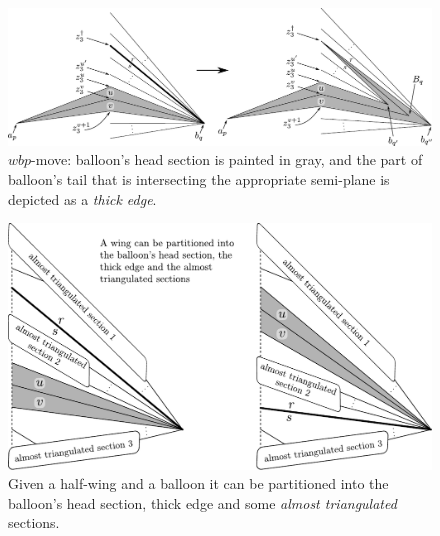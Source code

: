 \begin{figure}[!htb]
\begin{center}
\includegraphics[width=15.4cm]{A.figs/controlmaps01.pdf}
\caption{$wbp$-move: balloon's head section is painted in gray, 
and the part of balloon's tail that is intersecting the appropriate
semi-plane is depicted as a {\em thick edge}. }
\label{fig:controlmaps01}
\end{center}
\end{figure}

\begin{figure}[!htb]
\begin{center}
\includegraphics[width=15cm]{A.figs/controlmaps01novo1.pdf}
\caption{Given a half-wing and a balloon it can be partitioned into the 
balloon's head section, thick edge and
some {\em almost triangulated} sections.}
\label{fig:controlmaps01novo1}
\end{center}
\end{figure}


